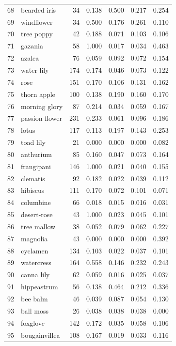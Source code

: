 \begin{longtable}{r l r r r r r}
68 & bearded iris & 34 & 0.138 & 0.500 & 0.217 & 0.254 \\
69 & windflower & 34 & 0.500 & 0.176 & 0.261 & 0.110 \\
70 & tree poppy & 42 & 0.188 & 0.071 & 0.103 & 0.106 \\
71 & gazania & 58 & 1.000 & 0.017 & 0.034 & 0.463 \\
72 & azalea & 76 & 0.059 & 0.092 & 0.072 & 0.154 \\
73 & water lily & 174 & 0.174 & 0.046 & 0.073 & 0.122 \\
74 & rose & 151 & 0.170 & 0.106 & 0.131 & 0.162 \\
75 & thorn apple & 100 & 0.138 & 0.190 & 0.160 & 0.170 \\
76 & morning glory & 87 & 0.214 & 0.034 & 0.059 & 0.167 \\
77 & passion flower & 231 & 0.233 & 0.061 & 0.096 & 0.186 \\
78 & lotus & 117 & 0.113 & 0.197 & 0.143 & 0.253 \\
79 & toad lily & 21 & 0.000 & 0.000 & 0.000 & 0.082 \\
80 & anthurium & 85 & 0.160 & 0.047 & 0.073 & 0.164 \\
81 & frangipani & 146 & 1.000 & 0.021 & 0.040 & 0.155 \\
82 & clematis & 92 & 0.182 & 0.022 & 0.039 & 0.112 \\
83 & hibiscus & 111 & 0.170 & 0.072 & 0.101 & 0.071 \\
84 & columbine & 66 & 0.018 & 0.015 & 0.016 & 0.031 \\
85 & desert-rose & 43 & 1.000 & 0.023 & 0.045 & 0.101 \\
86 & tree mallow & 38 & 0.052 & 0.079 & 0.062 & 0.227 \\
87 & magnolia & 43 & 0.000 & 0.000 & 0.000 & 0.392 \\
88 & cyclamen & 134 & 0.103 & 0.022 & 0.037 & 0.101 \\
89 & watercress & 164 & 0.558 & 0.146 & 0.232 & 0.243 \\
90 & canna lily & 62 & 0.059 & 0.016 & 0.025 & 0.037 \\
91 & hippeastrum & 56 & 0.138 & 0.464 & 0.212 & 0.336 \\
92 & bee balm & 46 & 0.039 & 0.087 & 0.054 & 0.130 \\
93 & ball moss & 26 & 0.038 & 0.038 & 0.038 & 0.000 \\
94 & foxglove & 142 & 0.172 & 0.035 & 0.058 & 0.106 \\
95 & bougainvillea & 108 & 0.167 & 0.019 & 0.033 & 0.116 \\

\end{longtable}

